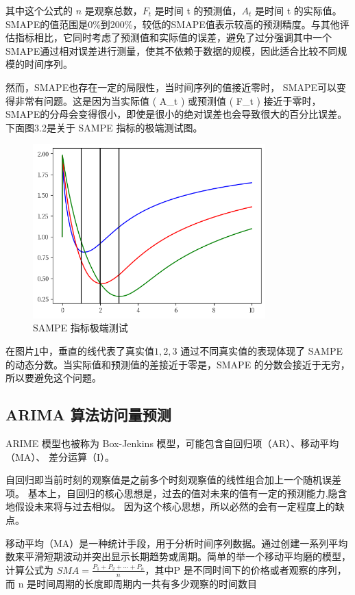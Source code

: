 其中这个公式的 $n$ 是观察总数，$F_t$ 是时间 t 的预测值，$A_t$ 是时间 t 的实际值。
SMAPE的值范围是0\%到200\%，较低的SMAPE值表示较高的预测精度。与其他评估指标相比，它同时考虑了预测值和实际值的误差，避免了过分强调其中一个
SMAPE通过相对误差进行测量，使其不依赖于数据的规模，因此适合比较不同规模的时间序列。

然而，SMAPE也存在一定的局限性，当时间序列的值接近零时，
SMAPE可以变得非常有问题。这是因为当实际值 ( A\_t ) 或预测值 ( F\_t ) 接近于零时，SMAPE的分母会变得很小，即使是很小的绝对误差也会导致很大的百分比误差。下面图3.2是关于 SAMPE 指标的极端测试图。

\begin{figure}
  \centering
  \includegraphics[width=0.8\textwidth]{figures/sampe_external.png}
  \caption{SAMPE 指标极端测试}
  \label{sampe-property}
\end{figure}

在图片\ref{sampe-property}中，垂直的线代表了真实值$1 , 2, 3$ 通过不同真实值的表现体现了 SAMPE 的动态分数。当实际值和预测值的差接近于零是，SMAPE 的分数会接近于无穷，所以要避免这个问题。

\subsection{ARIMA 算法访问量预测}

ARIME 模型也被称为 Box-Jenkins 模型，可能包含自回归项（AR）、移动平均（MA）、
差分运算（I）。

自回归即当前时刻的观察值是之前多个时刻观察值的线性组合加上一个随机误差项。
基本上，自回归的核心思想是，过去的值对未来的值有一定的预测能力,隐含地假设未来将与过去相似。
因为这个核心思想，所以必然的会有一定程度上的缺点。

移动平均（MA）是一种统计手段，用于分析时间序列数据。通过创建一系列平均数来平滑短期波动并突出显示长期趋势或周期。简单的举一个移动平均磨的模型，计算公式为 $SMA = \frac{P_1 + P_2 + \cdots + P_n}{n}$，其中P 是不同时间下的价格或者观察的序列，
而 n 是时间周期的长度即周期内一共有多少观察的时间数目

